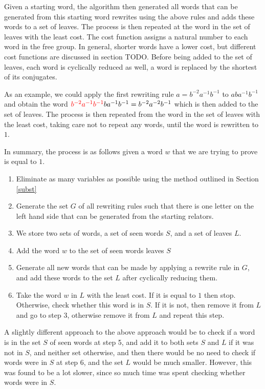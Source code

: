 \documentclass[12pt]{article} %
\theoremstyle{definition}
\theoremstyle{definition}
\theoremstyle{definition}
\theoremstyle{definition}
\theoremstyle{definition}
\theoremstyle{definition}
\begin{document}
  Given a starting word, the algorithm then generated all words that can be generated
  from this starting word rewrites using the above rules and adds these
  words to a set of leaves. The process is then repeated at the word in the set of
  leaves with the least cost. The cost function assigns a natural number to each word in
  the free group. In general, shorter words have a lower cost, but different cost functions
  are discussed in section TODO. Before being added to the set of leaves, each word is cyclically
  reduced as well, a word is replaced by the shortest of its conjugates.

  As an example, we could apply the first rewriting rule $a = b^{-2}a^{-1}b^{-1}$
  to $aba^{-1}b^{-1}$ and obtain the word
  $\color{red}b^{-2}a^{-1}b^{-1}\color{black}ba^{-1}b^{-1} =
  b^{-2}a^{-2}b^{-1}$ which is then added to the set of leaves. The process
  is then repeated from the word in the set of leaves with the least cost, taking care
  not to repeat any words, until the word is rewritten to $1$.

  In summary, the process is as follows given a word $w$ that we are trying to prove is equal
  to $1$.
  \begin{enumerate}
    \item Eliminate as many variables as possible using the method outlined in Section \ref{subst}
    \item Generate the set $G$ of all rewriting rules such that there is one letter on the
      left hand side that can be generated from the starting relators.
    \item We store two sets of words, a set of seen words $S$, and a set of leaves $L$.
    \item Add the word $w$ to the set of seen words leaves $S$
    \item Generate all new words that can be made by applying a rewrite rule in $G$,
      and add these words to the set $L$ after cyclically reducing them.
    \item Take the word $w$ in $L$ with the least cost.
      If it is equal to $1$ then stop. Otherwise, check whether this
      word is in $S$. If it is not, then remove
      it from $L$ and go to step 3, otherwise remove it from $L$ and repeat this step.
  \end{enumerate}

A slightly different approach to the above approach would be to check if
a word is in the set $S$ of seen words at step 5, and add it to both sets $S$ and $L$
if it was not in $S$, and neither set otherwise, and then there would be no need to check
if words were in $S$ at step 6, and the set $L$ would be much smaller. However, this was
found to be a lot slower, since so much time was spent checking whether words were in $S$.
\end{document}
